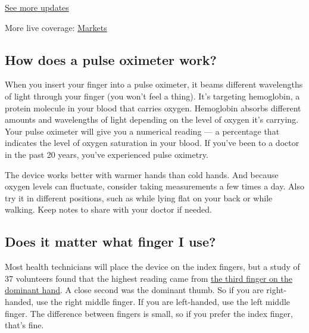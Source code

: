 \href{https://www.nytimes3xbfgragh.onion/2020/09/11/world/covid-19-coronavirus.html?action=click\&pgtype=Article\&state=default\&region=MAIN_CONTENT_1\&context=storylines_live_updates}{See
more updates}

More live coverage:
\href{https://www.nytimes3xbfgragh.onion/live/2020/09/11/business/stock-market-today-coronavirus?action=click\&pgtype=Article\&state=default\&region=MAIN_CONTENT_1\&context=storylines_live_updates}{Markets}

\hypertarget{how-does-a-pulse-oximeter-work}{%
\subsection{How does a pulse oximeter
work?}\label{how-does-a-pulse-oximeter-work}}

When you insert your finger into a pulse oximeter, it beams different
wavelengths of light through your finger (you won't feel a thing). It's
targeting hemoglobin, a protein molecule in your blood that carries
oxygen. Hemoglobin absorbs different amounts and wavelengths of light
depending on the level of oxygen it's carrying. Your pulse oximeter will
give you a numerical reading --- a percentage that indicates the level
of oxygen saturation in your blood. If you've been to a doctor in the
past 20 years, you've experienced pulse oximetry.

The device works better with warmer hands than cold hands. And because
oxygen levels can fluctuate, consider taking measurements a few times a
day. Also try it in different positions, such as while lying flat on
your back or while walking. Keep notes to share with your doctor if
needed.

\hypertarget{does-it-matter-what-finger-i-use}{%
\subsection{Does it matter what finger I
use?}\label{does-it-matter-what-finger-i-use}}

Most health technicians will place the device on the index fingers, but
a study of 37 volunteers found that the highest reading came from
\href{https://www.ncbi.nlm.nih.gov/pmc/articles/PMC4627972/}{the third
finger on the dominant hand}. A close second was the dominant thumb. So
if you are right-handed, use the right middle finger. If you are
left-handed, use the left middle finger. The difference between fingers
is small, so if you prefer the index finger, that's fine.

